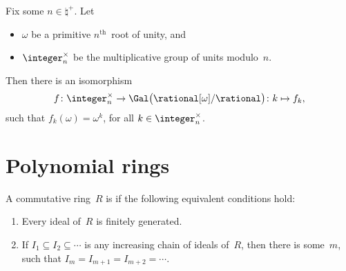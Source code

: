 \begin{prop} \label{Gal(cyclotomic)}
Fix some $n \in \natural^+$.
 Let 
 \begin{itemize}
 \item $\omega$ be a primitive $n^\text{th}$~root of unity,
and
 \item $\integer_n^\times$ be the multiplicative group
of units modulo~$n$.
 \end{itemize}
Then there is an isomorphism 
 $$f \colon \integer_n^\times \to \Gal \bigl(
\rational[\omega]/\rational \bigr) 
\colon k \mapsto f_k,$$
 such that $f_k(\omega) = \omega^k$, for all $k \in
\integer_n^\times$.
 \end{prop}





\section{Polynomial rings}

\begin{defn}
 A commutative ring~$R$ is 
if the following equivalent conditions hold:
 \begin{enumerate}
 \item Every ideal of~$R$ is finitely generated.
 \item If $I_1 \subseteq I_2 \subseteq \cdots$ is any increasing
chain of ideals of~$R$, then there is some~$m$, such that $I_m = I_{m+1} = I_{m+2} = \cdots$.
 \end{enumerate}
 \end{defn}

%
%
%

